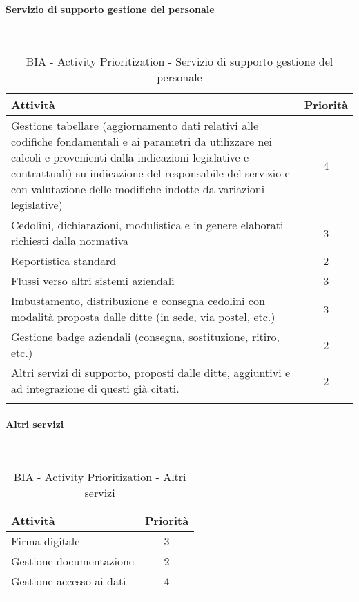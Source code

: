\paragraph{Servizio di supporto gestione del personale}
\textcolor{white}{.} \\
\renewcommand\arraystretch{1,5}
\begin{longtable}{p{11cm} c }
\toprule
\textbf{Attività} & \textbf{Priorità} \\
\toprule
Gestione tabellare (aggiornamento dati relativi alle codifiche fondamentali e ai parametri da 
utilizzare nei calcoli e provenienti dalla indicazioni legislative e contrattuali) su indicazione 
del  responsabile  del  servizio  e  con  valutazione  delle  modifiche  indotte  da  variazioni 
legislative)  &4 \\
Cedolini, dichiarazioni, modulistica e in genere elaborati richiesti dalla normativa  & 3 \\
Reportistica standard  & 2 \\
Flussi verso altri sistemi aziendali  & 3 \\
Imbustamento, distribuzione e consegna cedolini con modalità proposta dalle ditte (in sede, 
via postel, etc.)  & 3\\
Gestione badge aziendali (consegna, sostituzione, ritiro, etc.)  & 2\\
Altri servizi di supporto,  proposti dalle ditte, aggiuntivi e ad integrazione di questi già citati.  & 2\\
\bottomrule
\caption{BIA - Activity Prioritization - Servizio di supporto gestione del personale}
\end{longtable}

\paragraph{Altri servizi}
\textcolor{white}{.} \\
\renewcommand\arraystretch{1,5}
\begin{longtable}{p{11cm} c }
\toprule
\textbf{Attività} & \textbf{Priorità} \\
\toprule
Firma digitale & 3 \\
Gestione documentazione & 2 \\
Gestione accesso ai dati & 4 \\
\bottomrule
\caption{BIA - Activity Prioritization - Altri servizi}
\end{longtable}

\newpage
